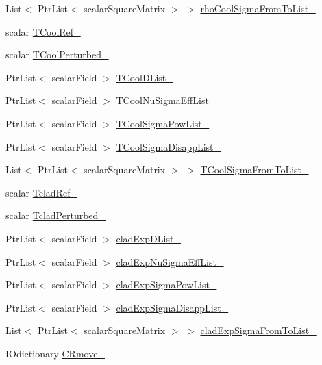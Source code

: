 \begin{DoxyCompactItemize}
\item 
List$<$ Ptr\+List$<$ scalar\+Square\+Matrix $>$ $>$ \hyperlink{classFoam_1_1XS_a7733a51d2c633e4fed22e7061659ec6b}{rho\+Cool\+Sigma\+From\+To\+List\+\_\+}
\item 
scalar \hyperlink{classFoam_1_1XS_ac3372b0ed28d321ccedf66628393b4ad}{T\+Cool\+Ref\+\_\+}
\item 
scalar \hyperlink{classFoam_1_1XS_a1850ffc8a76b1b29964c4ddf8e4d49d0}{T\+Cool\+Perturbed\+\_\+}
\item 
Ptr\+List$<$ scalar\+Field $>$ \hyperlink{classFoam_1_1XS_a7073f6cbfc582be57db1b669a666a6e6}{T\+Cool\+D\+List\+\_\+}
\item 
Ptr\+List$<$ scalar\+Field $>$ \hyperlink{classFoam_1_1XS_a4aeda1b004e53153607ab34a8535c78b}{T\+Cool\+Nu\+Sigma\+Eff\+List\+\_\+}
\item 
Ptr\+List$<$ scalar\+Field $>$ \hyperlink{classFoam_1_1XS_a1cb5f2c736e678047486275b8d30a012}{T\+Cool\+Sigma\+Pow\+List\+\_\+}
\item 
Ptr\+List$<$ scalar\+Field $>$ \hyperlink{classFoam_1_1XS_a1fbe508bbd07aa65cdb20fd850eec54a}{T\+Cool\+Sigma\+Disapp\+List\+\_\+}
\item 
List$<$ Ptr\+List$<$ scalar\+Square\+Matrix $>$ $>$ \hyperlink{classFoam_1_1XS_a399ed20b9c50c782cc7a6d4149b8911e}{T\+Cool\+Sigma\+From\+To\+List\+\_\+}
\item 
scalar \hyperlink{classFoam_1_1XS_a87e79a2257e79d89e25c61ee039d91a0}{Tclad\+Ref\+\_\+}
\item 
scalar \hyperlink{classFoam_1_1XS_a0c6ce4615de673dc1b394551383a4306}{Tclad\+Perturbed\+\_\+}
\item 
Ptr\+List$<$ scalar\+Field $>$ \hyperlink{classFoam_1_1XS_ae03abbd2301246ee28d49d2308db30d1}{clad\+Exp\+D\+List\+\_\+}
\item 
Ptr\+List$<$ scalar\+Field $>$ \hyperlink{classFoam_1_1XS_aff0842a57f719497e0b218011a9f2bb7}{clad\+Exp\+Nu\+Sigma\+Eff\+List\+\_\+}
\item 
Ptr\+List$<$ scalar\+Field $>$ \hyperlink{classFoam_1_1XS_ae912b858880f1eab676702606d27daca}{clad\+Exp\+Sigma\+Pow\+List\+\_\+}
\item 
Ptr\+List$<$ scalar\+Field $>$ \hyperlink{classFoam_1_1XS_a431532a3f51fc5c0b3f6c2dacf9eaf15}{clad\+Exp\+Sigma\+Disapp\+List\+\_\+}
\item 
List$<$ Ptr\+List$<$ scalar\+Square\+Matrix $>$ $>$ \hyperlink{classFoam_1_1XS_ae08aea5cb35d13155b6500359220a610}{clad\+Exp\+Sigma\+From\+To\+List\+\_\+}
\item 
I\+Odictionary \hyperlink{classFoam_1_1XS_a29c44ad7cad96a26dabbceeb7e4726eb}{C\+Rmove\+\_\+}

\end{DoxyCompactItemize}
